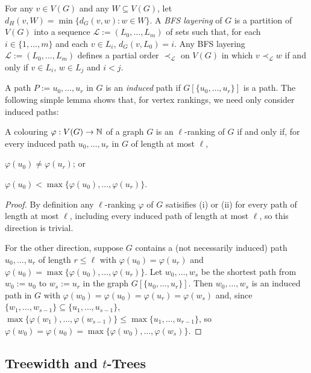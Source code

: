 \documentclass[kpfonts]{patmorin}
\theoremstyle{named}
\begin{document}
For any $v\in V(G)$ and any $W\subseteq V(G)$, let $d_H(v,W)=\min\{d_G(v,w):w\in W\}$. A \emph{BFS layering} of $G$ is a partition of $V(G)$ into a sequence $\mathcal{L}:=(L_0,\ldots,L_m)$ of sets such that, for each $i\in\{1,\ldots,m\}$ and each $v\in L_i$, $d_G(v,L_0)=i$.  Any BFS layering $\mathcal{L}:=(L_0,\ldots,L_m)$ defines a partial order $\prec_{\mathcal{L}}$ on $V(G)$ in which $v\prec_{\mathcal{L}} w$ if and only if $v\in L_i$, $w\in L_j$ and $i<j$.

A path $P:=u_0,\ldots,u_r$ in $G$ is an \emph{induced} path if $G[\{u_0,\ldots,u_r\}]$ is a path.  The following simple lemma shows that, for vertex rankings, we need only consider induced paths:

\begin{obs}\label{induced-paths-only}
    A colouring $\varphi:V(G)\to\mathbb{N}$ of a graph $G$ is an $\ell$-ranking of $G$ if and only if, for every induced path $u_0,\ldots,u_r$ in $G$ of length at most $\ell$,
    \begin{inparaenum}[(i)]
        \item $\varphi(u_0)\neq\varphi(u_r)$; or
        \item $\varphi(u_0)<\max\{\varphi(u_0),\ldots,\varphi(u_r)\}$.
    \end{inparaenum}
\end{obs}

\begin{proof}
    By definition any $\ell$-ranking $\varphi$ of $G$ satisifies (i) or (ii) for every path of length at most $\ell$, including every induced path of length at most $\ell$, so this direction is trivial.

    For the other direction, suppose $G$ contains a (not necessarily induced) path $u_0,\ldots,u_r$ of length $r\le\ell$ with $\varphi(u_0)=\varphi(u_r)$ and $\varphi(u_0)=\max\{\varphi(u_0),\ldots,\varphi(u_r)\}$.  Let $w_0,\ldots,w_s$ be the shortest path from $w_0:=u_0$ to $w_s:=u_r$ in  the graph $G[\{u_0,\ldots,u_r\}]$.  Then $w_0,\ldots,w_s$ is an induced path in $G$ with $\varphi(w_0)=\varphi(u_0)=\varphi(u_r)=\varphi(w_s)$ and, since $\{w_1,\ldots,w_{s-1}\}\subseteq\{u_1,\ldots,u_{s-1}\}$, $\max\{\varphi(w_1),\ldots,\varphi(w_{s-1})\}\le\max\{u_1,\ldots,u_{r-1}\}$, so $\varphi(w_0)=\varphi(u_0)=\max\{\varphi(w_0),\ldots,\varphi(w_s)\}$.
\end{proof}


\subsection{Treewidth and $t$-Trees}
\end{document}
